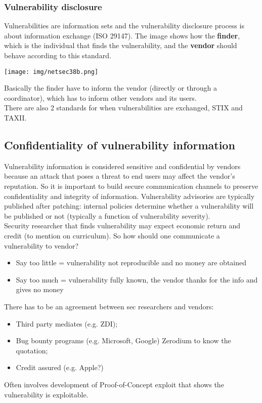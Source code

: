 \documentclass[a4paper, 10pt, titlepage]{article}
\begin{document}
\subsubsection*{Vulnerability disclosure}
Vulnerabilities are information sets and the vulnerability disclosure process is about information exchange (ISO 29147).
The image shows how the \textbf{finder}, which is the individual that finds the vulnerability, and the \textbf{vendor} should behave according to this standard.
\begin{center}
	\texttt{[image: img/netsec38b.png]}
\end{center}
Basically the finder have to inform the vendor (directly or through a coordinator), which has to inform other vendors and its users. \\
There are also 2 standards for when vulnerabilities are exchanged, STIX and TAXII.

\subsection*{Confidentiality of vulnerability information}
Vulnerability information is considered sensitive and confidential by vendors because an attack that poses a threat to end users may affect the vendor’s reputation. So it is important to build secure communication channels to preserve confidentiality and integrity of information. Vulnerability advisories are typically published after patching: internal policies determine whether a vulnerability will be published or not (typically a function of vulnerability severity). \medskip\\
Security researcher that finds vulnerability may expect economic return and credit (to mention on curriculum). So how should one communicate a vulnerability to vendor?
\begin{itemize}
	\item Say too little = vulnerability not reproducible and no money are obtained
	\item Say too much = vulnerability fully known, the vendor thanks for the info and gives no money
\end{itemize}
There has to be an agreement between sec researchers and vendors:
\begin{itemize}
	\item Third party mediates (e.g. ZDI);
	\item Bug bounty programs (e.g. Microsoft, Google) Zerodium to know the quotation;
	\item Credit assured (e.g. Apple?)
\end{itemize}
Often involves development of Proof-of-Concept exploit that shows the vulnerability is exploitable.
\end{document}

